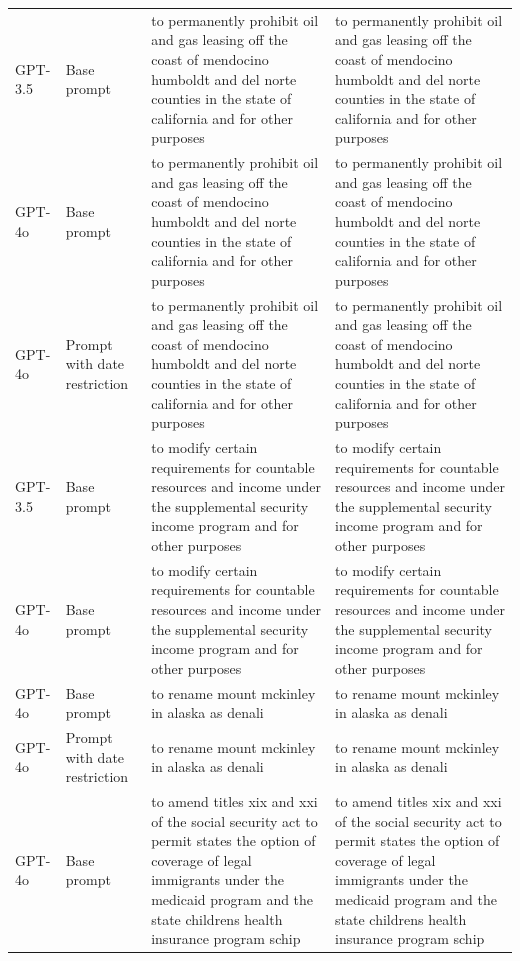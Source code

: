 \begin{longtable}{>{\raggedright\arraybackslash}p{1.4cm}>{\raggedright\arraybackslash}p{1.4cm}>{\raggedright\arraybackslash}p{5.5cm}>{\raggedright\arraybackslash}p{5.5cm}}
GPT-3.5 & Base prompt & to permanently prohibit oil and gas leasing off the coast of mendocino humboldt and del norte counties in the state of california and for other purposes & to permanently prohibit oil and gas leasing off the coast of mendocino humboldt and del norte counties in the state of california and for other purposes\\
GPT-4o & Base prompt & to permanently prohibit oil and gas leasing off the coast of mendocino humboldt and del norte counties in the state of california and for other purposes & to permanently prohibit oil and gas leasing off the coast of mendocino humboldt and del norte counties in the state of california and for other purposes\\
GPT-4o & Prompt with date restriction & to permanently prohibit oil and gas leasing off the coast of mendocino humboldt and del norte counties in the state of california and for other purposes & to permanently prohibit oil and gas leasing off the coast of mendocino humboldt and del norte counties in the state of california and for other purposes\\
GPT-3.5 & Base prompt & to modify certain requirements for countable resources and income under the supplemental security income program and for other purposes & to modify certain requirements for countable resources and income under the supplemental security income program and for other purposes\\
GPT-4o & Base prompt & to modify certain requirements for countable resources and income under the supplemental security income program and for other purposes & to modify certain requirements for countable resources and income under the supplemental security income program and for other purposes\\
GPT-4o & Base prompt & to rename mount mckinley in alaska as denali & to rename mount mckinley in alaska as denali\\
GPT-4o & Prompt with date restriction & to rename mount mckinley in alaska as denali & to rename mount mckinley in alaska as denali\\
GPT-4o & Base prompt & to amend titles xix and xxi of the social security act to permit states the option of coverage of legal immigrants under the medicaid program and the state childrens health insurance program schip & to amend titles xix and xxi of the social security act to permit states the option of coverage of legal immigrants under the medicaid program and the state childrens health insurance program schip\\

\end{longtable}

